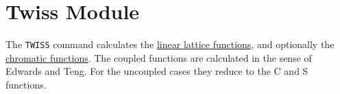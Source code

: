 

\chapter{Twiss Module}
\label{chap:twiss}

The \texttt{TWISS} command calculates the
\href{../Introduction/tables.html#linear}{linear lattice
  functions}\cite{Courant_Snyder1958}, and optionally the
\href{../Introduction/tables.html#chrom}{chromatic functions}. 
The coupled functions are calculated in the sense of
Edwards and Teng\cite{edwards1973}. 
For the uncoupled cases they reduce to the C and S functions. 


